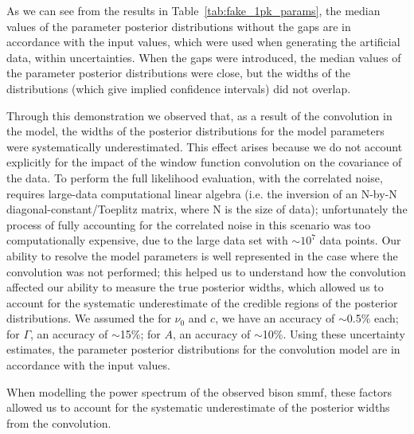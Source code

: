 As we can see from the results in Table~\ref{tab:fake_1pk_params}, the median values of the parameter posterior distributions without the gaps are in accordance with the input values, which were used when generating the artificial data, within uncertainties. When the gaps were introduced, the median values of the parameter posterior distributions were close, but the widths of the distributions (which give implied confidence intervals) did not overlap. %

Through this demonstration we observed that, as a result of the convolution in the model, the widths of the posterior distributions for the model parameters were systematically underestimated. This effect arises because we do not account explicitly for the impact of the window function convolution on the covariance of the data. To perform the full likelihood evaluation, with the correlated noise, requires large-data computational linear algebra (i.e. the inversion of an N-by-N diagonal-constant/Toeplitz matrix, where N is the size of data); unfortunately the process of fully accounting for the correlated noise in this scenario was too computationally expensive, due to the large data set with $\sim10^7$ data points. Our ability to resolve the model parameters is well represented in the case where the convolution was not performed; this helped us to understand how the convolution affected our ability to measure the true posterior widths, which allowed us to account for the systematic underestimate of the credible regions of the posterior distributions. We assumed the for $\nu_0$ and $c$, we have an accuracy of $\sim$0.5\% each; for $\Gamma$, an accuracy of $\sim$15\%; for $A$, an accuracy of $\sim$10\%. Using these uncertainty estimates, the parameter posterior distributions for the convolution model are in accordance with the input values.

When modelling the power spectrum of the observed \gls{bison} \gls{smmf}, these factors allowed us to account for the systematic underestimate of the posterior widths from the convolution.




